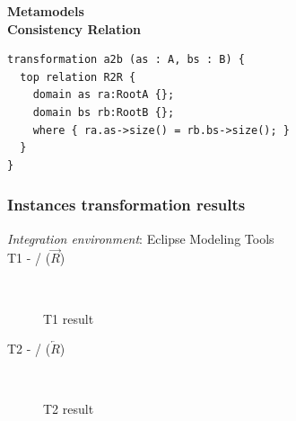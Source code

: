 \documentclass{article}
\begin{document}
\textbf{Metamodels}
~\\

\textbf{Consistency Relation}
\begin{lstlisting}[language=QVT]
transformation a2b (as : A, bs : B) {
  top relation R2R { 
    domain as ra:RootA {};
    domain bs rb:RootB {};
    where { ra.as->size() = rb.bs->size(); }
  }
}
\end{lstlisting}


\subsubsection{Instances transformation results}
\textit{Integration environment}: Eclipse Modeling Tools
~\\

T1 -  /  ($\overrightarrow{R}$)
\begin{figure}[ht]
    \centering
    \mbox{\quad\qquad
          }
    \caption{T1 result}
    \label{fig:T1}
\end{figure}

\pagebreak

T2 -  /  ($\overleftarrow{R}$)
\begin{figure}[ht]
    \centering
    \mbox{\quad\qquad\quad
          }
    \caption{T2 result}
    \label{fig:T2}
\end{figure}
\end{document}
